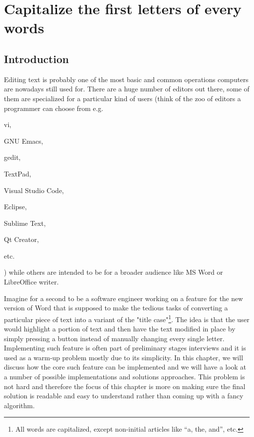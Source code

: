 %

\chapter{Capitalize the first letters of every words}
\label{ch:capitalize_words_first_letter}
\section*{Introduction}
Editing text is probably one of the most basic and common operations computers are nowadays still used for. There are a huge number of editors out there, some of them are specialized for a particular kind of users (think of the zoo of editors a programmer can choose from e.g.
\begin{enumerate*}
	\item vi,
	\item GNU Emacs,
	\item gedit,
	\item TextPad,
	\item Visual Studio Code,
	\item Eclipse,
	\item Sublime Text,
	\item Qt Creator,
	\item etc.
\end{enumerate*}
) while others are intended to be for a broader audience like MS Word or LibreOffice writer. 

Imagine for a second to be a software engineer working on a feature for the new version of Word that is supposed to make the tedious tasks of converting a particular piece of text into a variant of the "title case"\footnote{All words are capitalized, except non-initial articles like “a, the, and”, etc.}.
The idea is that the user would highlight a portion of text and then have the text modified in place by simply pressing a button instead of manually changing every single letter. Implementing such feature is often part of preliminary stages interviews and it is used as a warm-up problem mostly due to its simplicity. 
In this chapter, we will discuss how the core such feature can be implemented and we will have a look at a number of possible implementations and solutions approaches. This problem is not hard and therefore the focus of this chapter is more on making sure the final solution is readable and easy to understand rather than coming up with a fancy algorithm.

